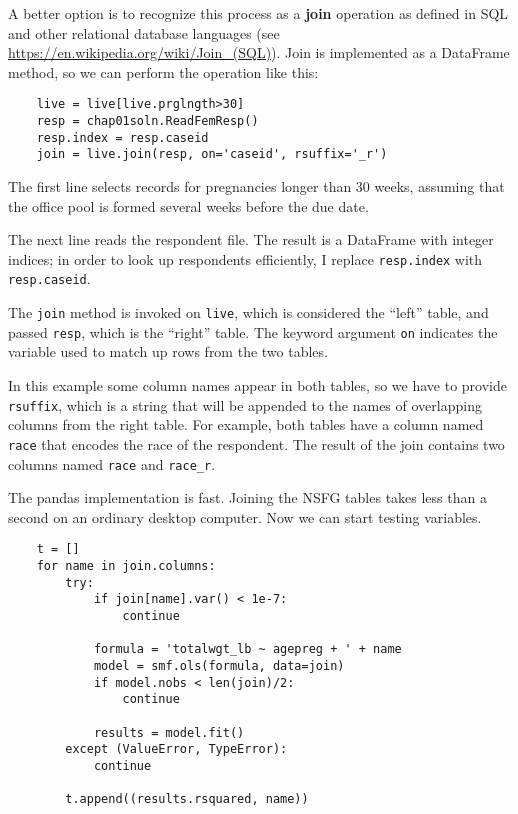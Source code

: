 A better option is to recognize this process as a {\bf join} operation
as defined in SQL and other relational database languages (see
\url{https://en.wikipedia.org/wiki/Join_(SQL)}).  Join is implemented
as a DataFrame method, so we can perform the operation like this:

\begin{verbatim}
    live = live[live.prglngth>30]
    resp = chap01soln.ReadFemResp()
    resp.index = resp.caseid
    join = live.join(resp, on='caseid', rsuffix='_r')
\end{verbatim}

The first line selects records for pregnancies longer than 30 weeks,
assuming that the office pool is formed several weeks before the
due date.

The next line reads the respondent file.  The result is a DataFrame
with integer indices; in order to look up respondents efficiently,
I replace {\tt resp.index} with {\tt resp.caseid}. 

The {\tt join} method is invoked on {\tt live}, which is considered
the ``left'' table, and passed {\tt resp}, which is the ``right'' table.
The keyword argument {\tt on} indicates the variable used to match up
rows from the two tables.

In this example some column names appear in both tables,
so we have to provide {\tt rsuffix}, which is a string that will be
appended to the names of overlapping columns from the right table.
For example, both tables have a column named {\tt race} that encodes
the race of the respondent.  The result of the join contains two
columns named {\tt race} and \verb"race_r".

The pandas implementation is fast.  Joining the NSFG tables takes
less than a second on an ordinary desktop computer.
Now we can start testing variables.

\begin{verbatim}
    t = []
    for name in join.columns:
        try:
            if join[name].var() < 1e-7:
                continue

            formula = 'totalwgt_lb ~ agepreg + ' + name
            model = smf.ols(formula, data=join)
            if model.nobs < len(join)/2:
                continue

            results = model.fit()
        except (ValueError, TypeError):
            continue

        t.append((results.rsquared, name))
\end{verbatim}

